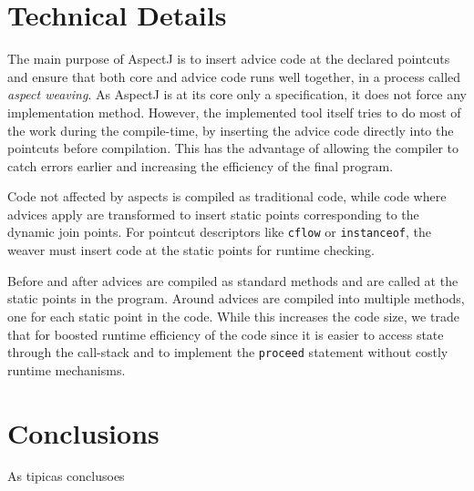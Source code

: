 \documentclass{template}
\begin{document}


\section{Technical Details}

The main purpose of AspectJ is to insert advice code at the declared pointcuts and ensure that
both core and advice code runs well together, in a process called \emph{aspect weaving}.
As AspectJ is at its core only a specification, it does not force any implementation method.
However, the implemented tool itself tries to do most of the work during the compile-time, by
inserting the advice code directly into the pointcuts before compilation. This has the advantage of
allowing the compiler to catch errors earlier and increasing the efficiency of the final program.

Code not affected by aspects is compiled as traditional code, while code where advices apply are
transformed to insert static points corresponding to the dynamic join points.
For pointcut descriptors like \texttt{cflow} or \texttt{instanceof}, the weaver must insert
code at the static points for runtime checking.

Before and after advices are compiled as standard methods and are called at the static points in
the program. Around advices are compiled into multiple methods, one for each static point in the code.
While this increases the code size, we trade that for boosted runtime efficiency of the code since
it is easier to access state through the call-stack and to implement the \texttt{proceed} statement
without costly runtime mechanisms.

\section{Conclusions}

As tipicas conclusoes \cite{Kiczales97aspect-orientedprogramming}




\balancecolumns
\end{document}
